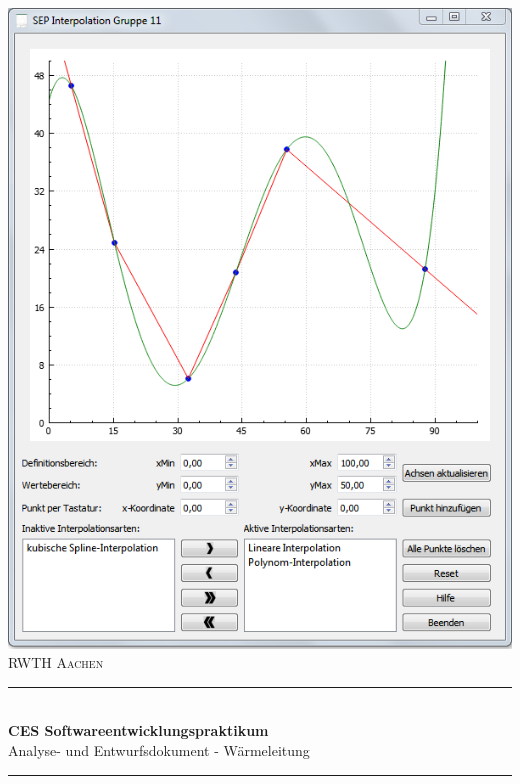 \begin{titlepage}

\begin{center}


\includegraphics[scale=.5]{Bilder/AppIcon1.PNG}\\[1cm]    

\textsc{\LARGE RWTH Aachen}\\[1.5cm]

\newcommand{\HRule}{\rule{\linewidth}{0.5mm}}
\HRule \\[0.4cm]
{ \huge \bfseries CES Softwareentwicklungspraktikum}\\[0.4cm]
{\Large Analyse- und Entwurfsdokument - Wärmeleitung}\\[0.5cm]
\HRule \\[1.5cm]


\end{center}
\end{titlepage}
